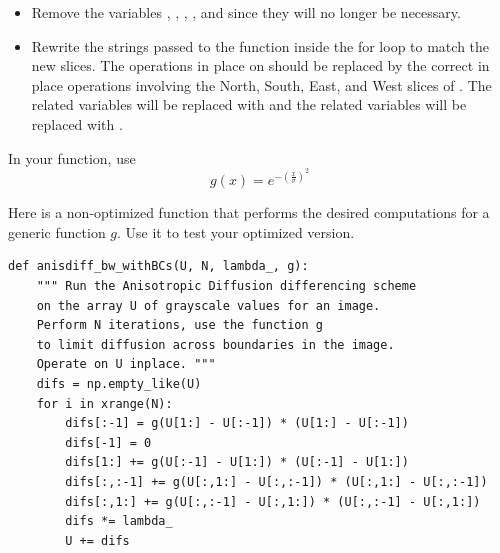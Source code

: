 \begin{problem}
\begin{itemize}
\item Remove the variables , , , , and  since they will no longer be necessary.

\item Rewrite the strings passed to the  function inside the for loop to match the new slices.
The operations in place on  should be replaced by the correct in place operations involving the North, South, East, and West slices of .
The  related variables will be replaced with  and the  related variables will be replaced with .

\end{itemize}

In your function, use
\[g(x) = e^{-\left(\frac{x}{\sigma}\right)^2}\]

Here is a non-optimized function that performs the desired computations for a generic function $g$.
Use it to test your optimized version.
\begin{lstlisting}
def anisdiff_bw_withBCs(U, N, lambda_, g):
    """ Run the Anisotropic Diffusion differencing scheme
    on the array U of grayscale values for an image.
    Perform N iterations, use the function g
    to limit diffusion across boundaries in the image.
    Operate on U inplace. """
    difs = np.empty_like(U)
    for i in xrange(N):
        difs[:-1] = g(U[1:] - U[:-1]) * (U[1:] - U[:-1])
        difs[-1] = 0
        difs[1:] += g(U[:-1] - U[1:]) * (U[:-1] - U[1:])
        difs[:,:-1] += g(U[:,1:] - U[:,:-1]) * (U[:,1:] - U[:,:-1])
        difs[:,1:] += g(U[:,:-1] - U[:,1:]) * (U[:,:-1] - U[:,1:])
        difs *= lambda_
        U += difs
\end{lstlisting}
\end{problem}

